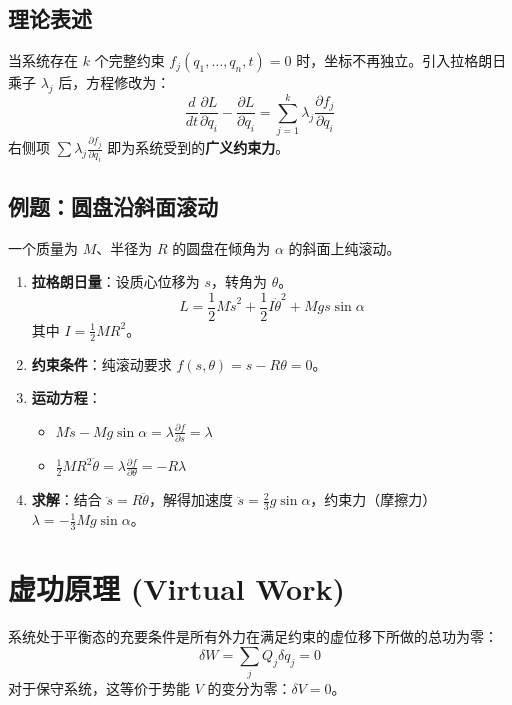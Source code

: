\documentclass[11pt,a4paper]{article}
\begin{document}
\subsection{理论表述}
当系统存在 $k$ 个完整约束 $f_j(q_1, \dots, q_n, t) = 0$ 时，坐标不再独立。引入拉格朗日乘子 $\lambda_j$ 后，方程修改为：
\[ \frac{d}{dt} \frac{\partial L}{\partial \dot{q}_i} - \frac{\partial L}{\partial q_i} = \sum_{j=1}^k \lambda_j \frac{\partial f_j}{\partial q_i} \]
右侧项 $\sum \lambda_j \frac{\partial f_j}{\partial q_i}$ 即为系统受到的\textbf{广义约束力}。

\subsection{例题：圆盘沿斜面滚动}
一个质量为 $M$、半径为 $R$ 的圆盘在倾角为 $\alpha$ 的斜面上纯滚动。
\begin{enumerate}
    \item \textbf{拉格朗日量}：设质心位移为 $s$，转角为 $\theta$。
    \[ L = \frac{1}{2}M\dot{s}^2 + \frac{1}{2}I\dot{\theta}^2 + Mgs\sin\alpha \]
    其中 $I = \frac{1}{2}MR^2$。
    \item \textbf{约束条件}：纯滚动要求 $f(s,\theta) = s - R\theta = 0$。
    \item \textbf{运动方程}：
    \begin{itemize}
        \item $M\ddot{s} - Mg\sin\alpha = \lambda \frac{\partial f}{\partial s} = \lambda$
        \item $\frac{1}{2}MR^2\ddot{\theta} = \lambda \frac{\partial f}{\partial \theta} = -R\lambda$
    \end{itemize}
    \item \textbf{求解}：结合 $\ddot{s} = R\ddot{\theta}$，解得加速度 $\ddot{s} = \frac{2}{3}g\sin\alpha$，约束力（摩擦力） $\lambda = -\frac{1}{3}Mg\sin\alpha$。
\end{enumerate}



\section{虚功原理 (Virtual Work)}
系统处于平衡态的充要条件是所有外力在满足约束的虚位移下所做的总功为零：
\[ \delta W = \sum_j Q_j \delta q_j = 0 \]
对于保守系统，这等价于势能 $V$ 的变分为零：$\delta V = 0$。
\end{document}
